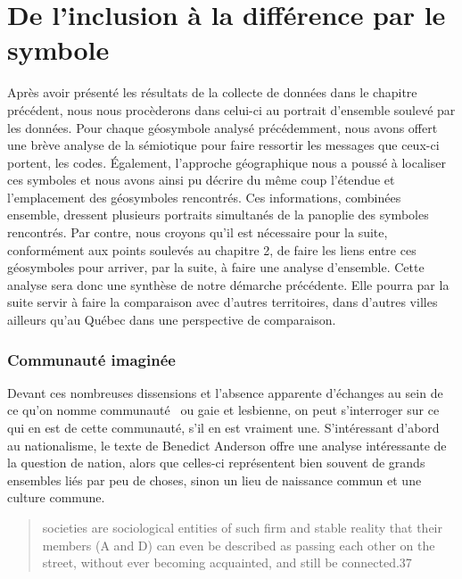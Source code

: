 
\chapter{De l'inclusion à la différence par le symbole}
\label{cha:de_l_inclusion_la_diff_rence_par_le_symbole}

Après avoir présenté les résultats de la collecte de données dans le chapitre précédent, nous nous procèderons dans celui-ci au portrait d'ensemble soulevé par les données.
Pour chaque géosymbole analysé précédemment, nous avons offert une brève analyse de la sémiotique pour faire ressortir les messages que ceux-ci portent, les codes.
Également, l'approche géographique nous a poussé à localiser ces symboles et nous avons ainsi pu décrire du même coup l'étendue et l'emplacement des géosymboles rencontrés.
Ces informations, combinées ensemble, dressent plusieurs portraits simultanés de la panoplie des symboles rencontrés.
Par contre, nous croyons qu'il est nécessaire pour la suite, conformément aux points soulevés au chapitre 2, de faire les liens entre ces géosymboles pour arriver, par la suite, à faire une analyse d'ensemble.
Cette analyse sera donc une synthèse de notre démarche précédente.
Elle pourra par la suite servir à faire la comparaison avec d'autres territoires, dans d'autres villes ailleurs qu'au Québec dans une perspective de comparaison.


\subsection{Communauté imaginée}
\label{sub:communaut_imagin_e}
Devant ces nombreuses dissensions et l'absence apparente d'échanges au sein de ce qu'on nomme communauté~\lgbt{} ou gaie et lesbienne, on peut s'interroger sur ce qui en est de cette communauté, s'il en est vraiment une.
S'intéressant d'abord au nationalisme, le texte de Benedict Anderson offre une analyse intéressante de la question de nation, alors que celles-ci représentent bien souvent de grands ensembles liés par peu de choses, sinon un lieu de naissance commun et une culture commune.
\begin{quote}	
societies are sociological entities of such firm and stable reality that their members (A and D) can even be described as passing each other on the street, without ever becoming acquainted, and still be connected.37 \citep{Anderson 1983}
\end{quote}

